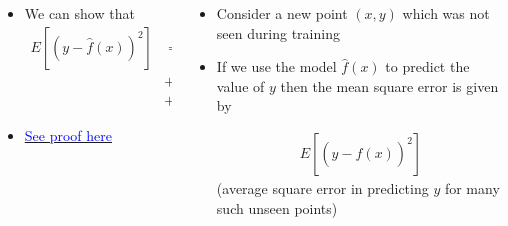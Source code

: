 \begin{frame}
\end{frame}

\begin{frame}
	\begin{columns}
		\begin{column}{0.4\textwidth}
			\begin{itemize}
				\item<3-> We can show that
				\begin{align*}
					E[ (y-\hat{f}(x))^2 ] & = Bias^2					 &   \\
								    & +Variance					&   \\
								    & + \sigma^2 \text{ (irreducible error)} &   
				\end{align*}
								
				\item<4-> \href{http://www.inf.ed.ac.uk/teaching/courses/mlsc/Notes/Lecture4/BiasVariance.pdf}{\textcolor{blue}{See proof here}}
			\end{itemize}
							
		\end{column}
		\begin{column}{0.55\textwidth}
			\begin{itemize}
				\justifying
				\setlength\itemsep{1em}
				\item<1-> Consider a new point $(x,y)$ which was not seen during training
				\item<2-> If we use the model $\hat{f}(x)$ to predict the value of $y$ then the mean square error is given by
									
				\begin{align*}
					E[(y-\hat{f}(x))^2] 
				\end{align*}
				(average square error in predicting $y$ for many such unseen points)
								
			\end{itemize}
		\end{column}
	\end{columns}
\end{frame}
